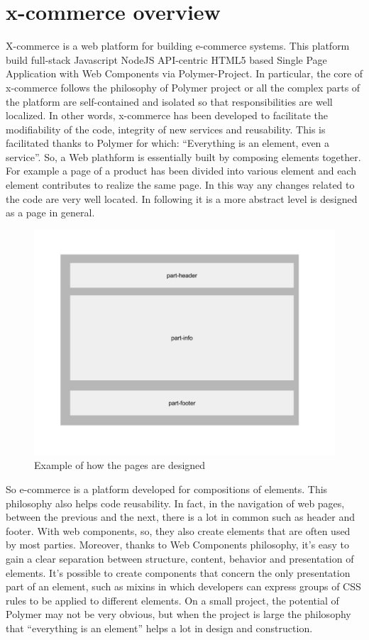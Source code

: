 \section{x-commerce overview}
\label{sec:x_commerce_overview}
X-commerce is a web platform for building e-commerce systems. This platform build full-stack Javascript NodeJS API-centric HTML5 based Single Page Application with Web Components via Polymer-Project. In particular, the core of x-commerce follows the philosophy of Polymer project or all the complex parts of the platform are self-contained and isolated so that responsibilities are well localized. In other words, x-commerce has been developed to facilitate the modifiability of the code, integrity of new services and reusability. This is facilitated thanks to Polymer for which: “Everything is an element, even a service”.
So, a Web plathform is essentially built by composing elements together.
\newline
For example a page of a product has been divided into various element and each element contributes to realize the same page. In this way any changes related to the code are very well located. In following it is a more abstract level is designed as a page in general.
\begin{figure}[htb]
 \centering
 \includegraphics[width=1.0\linewidth]{images/chapter4/design-page.jpg}\hfill
 \caption[Design page]{Example of how the pages are designed}
 \label{fig:design_page}
\end{figure}
So e-commerce is a platform developed for compositions of elements. This philosophy also helps code reusability. In fact, in the navigation of web pages, between the previous and the next, there is a lot in common such as header and footer. With web components, so, they also create elements that are often used by most parties.
Moreover, thanks to Web Components philosophy, it’s easy to gain a clear separation between structure, content, behavior and presentation of elements. It’s possible to create components that concern the only presentation part of an element, such as mixins in which developers can express groups of CSS rules to be applied to different elements.
\newline
On a small project, the potential of Polymer may not be very obvious, but when the project is large the philosophy that “everything is an element” helps a lot in design and construction.